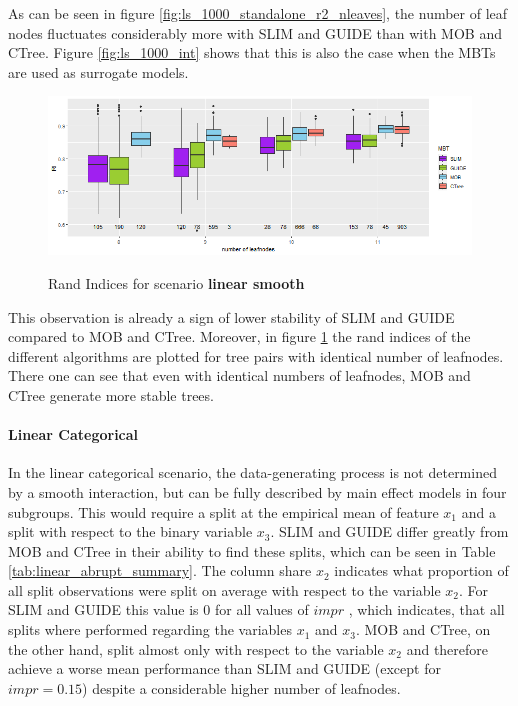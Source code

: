 As can be seen in figure \ref{fig:ls_1000_standalone_r2_nleaves}, the number of leaf nodes fluctuates considerably more with SLIM and GUIDE than with MOB and CTree. 
Figure \ref{fig:ls_1000_int} shows that this is also the case when the MBTs are used as surrogate models. 


\begin{figure}[!htb]
\caption{Rand Indices for scenario \textbf{linear smooth}}
    \centering
    \includegraphics[width=16cm]{Figures/simulations/batchtools/basic_scenarios/linear_smooth/ls_1000_standalone_sta.png}
    \label{fig:ls_1000_standalone_sta}
\end{figure}

This observation is already a sign of lower stability of SLIM and GUIDE compared to MOB and CTree. Moreover, in figure \ref{fig:ls_1000_standalone_sta} the rand indices of the different algorithms are plotted for tree pairs with identical number of leafnodes. There one can see that even with identical numbers of leafnodes, MOB and CTree generate more stable trees.







\paragraph{Linear Categorical} 
In the linear categorical scenario, the data-generating process is not determined by a smooth interaction, but can be fully described by main effect models in four subgroups.
This would require a split at the empirical mean of  feature $x_1$ and a split with respect to the binary variable $x_3$. 
SLIM and GUIDE differ greatly from MOB and CTree in their ability to find these splits, which can be seen in Table \ref{tab:linear_abrupt_summary}. 
The column share $x_2$ indicates what proportion of all split observations were split on average with respect to the variable $x_2$.
For SLIM and GUIDE this value is $0$ for all values of $impr$ , which indicates, that all splits where performed regarding the variables $x_1$ and $x_3$.
MOB and CTree, on the other hand, split almost only with respect to the variable $x_2$ and therefore achieve a worse mean performance than SLIM and GUIDE (except for $impr = 0.15$) despite a considerable higher number of leafnodes.


